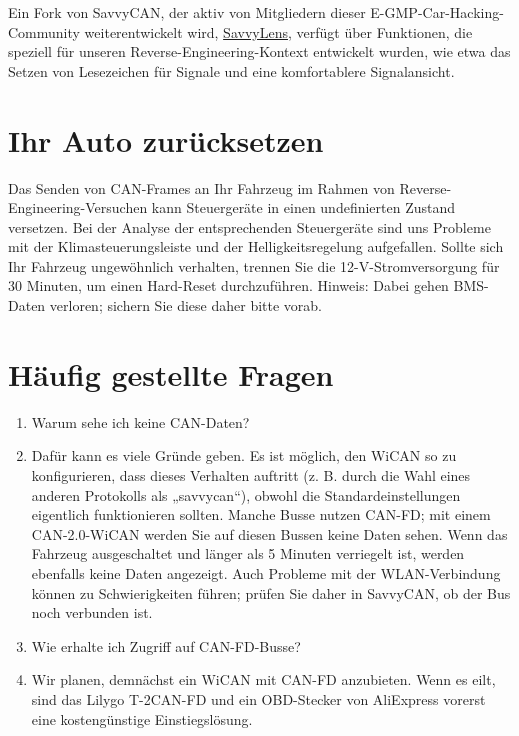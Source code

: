 \documentclass[superscriptaddress,onecolumn,floatfix]{revtex4-2}
\begin{document}
Ein Fork von SavvyCAN, der aktiv von Mitgliedern dieser E-GMP-Car-Hacking-Community weiterentwickelt wird, \href{https://github.com/SuperSuave/SavvyLens}{SavvyLens}, verfügt über Funktionen, die speziell für unseren Reverse-Engineering-Kontext entwickelt wurden, wie etwa das Setzen von Lesezeichen für Signale und eine komfortablere Signalansicht.

\section{Ihr Auto zurücksetzen}

Das Senden von CAN-Frames an Ihr Fahrzeug im Rahmen von Reverse-Engineering-Versuchen kann Steuergeräte in einen undefinierten Zustand versetzen. Bei der Analyse der entsprechenden Steuergeräte sind uns Probleme mit der Klimasteuerungsleiste und der Helligkeitsregelung aufgefallen. Sollte sich Ihr Fahrzeug ungewöhnlich verhalten, trennen Sie die 12-V-Stromversorgung für 30 Minuten, um einen Hard-Reset durchzuführen. Hinweis: Dabei gehen BMS-Daten verloren; sichern Sie diese daher bitte vorab.

\section{Häufig gestellte Fragen}
\begin{enumerate}
  \item[F:] Warum sehe ich keine CAN-Daten?
  \item[A:] Dafür kann es viele Gründe geben. Es ist möglich, den WiCAN so zu konfigurieren, dass dieses Verhalten auftritt (z. B. durch die Wahl eines anderen Protokolls als „savvycan“), obwohl die Standardeinstellungen eigentlich funktionieren sollten. Manche Busse nutzen CAN-FD; mit einem CAN-2.0-WiCAN werden Sie auf diesen Bussen keine Daten sehen. Wenn das Fahrzeug ausgeschaltet und länger als 5 Minuten verriegelt ist, werden ebenfalls keine Daten angezeigt. Auch Probleme mit der WLAN-Verbindung können zu Schwierigkeiten führen; prüfen Sie daher in SavvyCAN, ob der Bus noch verbunden ist.
  \item[F:] Wie erhalte ich Zugriff auf CAN-FD-Busse?
  \item[A:] Wir planen, demnächst ein WiCAN mit CAN-FD anzubieten. Wenn es eilt, sind das Lilygo T-2CAN-FD und ein OBD-Stecker von AliExpress vorerst eine kostengünstige Einstiegslösung.
\end{enumerate}
\appendix 

{}
\end{document}
